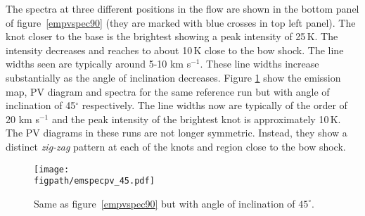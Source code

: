 \documentclass[useAMS,usenatbib]{mn2e}
\newcommand{\figpath}{/Users/bhargavvaidya/MyProject/work/Leeds_Uni/SiOJets_New/PAPER/PFIGS/}
\begin{document}
The spectra at three different positions in the flow are shown in the
bottom panel of figure~\ref{empvspec90} (they are marked with blue
crosses in top left panel). The knot closer to the base is the brightest
showing a peak intensity of 25\,K. The
intensity decreases and reaches to about 10\,K close to the bow shock.
The line widths seen are typically around 5-10 km s$^{-1}$.
These line widths increase substantially as the angle of inclination
decreases. Figure \ref{empvspec45} show the
emission map, PV diagram and spectra for the same reference run but
with angle of inclination of 45$^{\circ}$
respectively. The line 
widths now are typically of the order of 20 km s$^{-1}$ and the peak
intensity of the brightest knot is approximately 10\,K. 
The PV diagrams in these runs are not longer symmetric. Instead, they show a distinct {\it zig-zag}
pattern at each of the knots and region close to the bow shock.



\begin{figure}
 \texttt{[image: \\figpath/emspecpv\_45.pdf]}%
 \caption{Same as figure~\ref{empvspec90} but with angle of
   inclination of $45^{\circ}$.} 
\label{empvspec45}
\end{figure}

\end{document}
